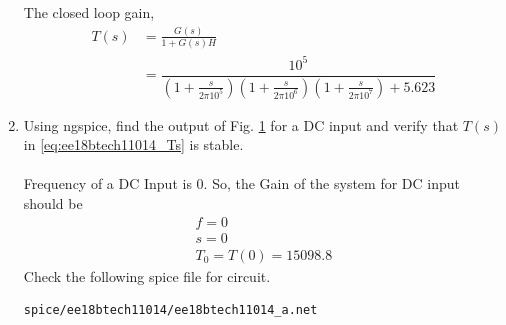 \begin{enumerate}[label=\thesection.\arabic*.,ref=\thesection.\theenumi]
\begin{figure}[ht!]
	\begin{center}
		\resizebox{\columnwidth}{!}{}
	\end{center}
	\caption{}
	\label{fig:ee18btech11014_Closed-Loop Circuit}
\end{figure}

%
%
%
%
The closed loop gain,
\begin{align}
T(s) &= \frac{G(s)}{1+G(s)H}
\\
&=\dfrac{10^5}{\left(1+\frac{s}{2\pi 10^{5}}\right)\left(1+\frac{s}{2\pi 10^{6}}\right)\left(1+\frac{s}{2\pi 10^{7}}\right)+5.623}
\label{eq:ee18btech11014_Ts}
\end{align}
\item Using ngspice, find the output of Fig.  \ref{fig:ee18btech11014_Closed-Loop Circuit} for a DC input and verify that $T(s)$ in \eqref{eq:ee18btech11014_Ts} is stable.\\
\solution\\
Frequency of a DC Input is $0$. So, the Gain of the system for DC input should be
\begin{align}
f = 0\\
s = 0\\
T_{0} = T(0) = 15098.8
\end{align} 
Check the following spice file for circuit.
\begin{lstlisting}
spice/ee18btech11014/ee18btech11014_a.net
\end{lstlisting}


\end{enumerate}
